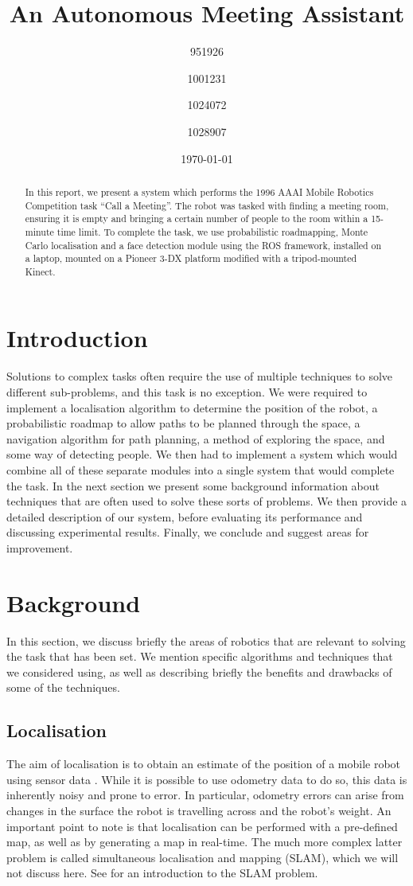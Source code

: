 \documentclass[conference]{IEEEtran}
\title{An Autonomous Meeting Assistant}
\author{951926 \and 1001231 \and 1024072 \and 1028907}
\date{\today}
\begin{document}
\maketitle

\begin{abstract}
In this report, we present a system which performs the 1996 AAAI Mobile Robotics Competition task ``Call a Meeting''\cite{AAAIcomp}. The robot was tasked with finding a meeting room, ensuring it is empty and bringing a certain number of people to the room within a 15-minute time limit. To complete the task, we use probabilistic roadmapping, Monte Carlo localisation and a face detection module using the ROS framework, installed on a laptop, mounted on a Pioneer 3-DX platform modified with a tripod-mounted Kinect.
\end{abstract}
\section{Introduction}
Solutions to complex tasks often require the use of multiple techniques to solve different sub-problems, and this task is no exception. We were required to implement a localisation algorithm to determine the position of the robot, a probabilistic roadmap to allow paths to be planned through the space, a navigation algorithm for path planning, a method of exploring the space, and some way of detecting people. We then had to implement a system which would combine all of these separate modules into a single system that would complete the task. In the next section we present some background information about techniques that are often used to solve these sorts of problems. We then provide a detailed description of our system, before evaluating its performance and discussing experimental results. Finally, we conclude and suggest areas for improvement.

\section{Background}
In this section, we discuss briefly the areas of robotics that are relevant to solving the task that has been set. We mention specific algorithms and techniques that we considered using, as well as describing briefly the benefits and drawbacks of some of the techniques.

\subsection{Localisation}
The aim of localisation is to obtain an estimate of the position of a mobile robot using sensor data \cite{localisation}. While it is possible to use odometry data to do so, this data is inherently noisy and prone to error. In particular, odometry errors can arise from changes in the surface the robot is travelling across and the robot's weight. An important point to note is that localisation can be performed with a pre-defined map, as well as by generating a map in real-time. The much more complex latter problem is called simultaneous localisation and mapping (SLAM), which we will not discuss here. See \cite{slam} for an introduction to the SLAM problem.
\end{document}

